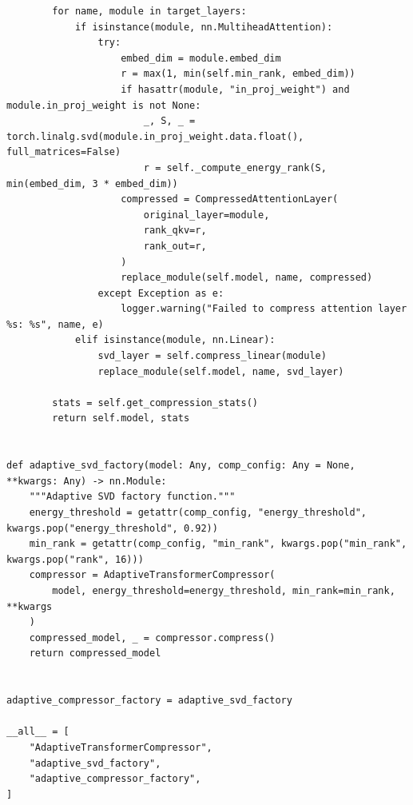 \begin{lstlisting}
        for name, module in target_layers:
            if isinstance(module, nn.MultiheadAttention):
                try:
                    embed_dim = module.embed_dim
                    r = max(1, min(self.min_rank, embed_dim))
                    if hasattr(module, "in_proj_weight") and module.in_proj_weight is not None:
                        _, S, _ = torch.linalg.svd(module.in_proj_weight.data.float(), full_matrices=False)
                        r = self._compute_energy_rank(S, min(embed_dim, 3 * embed_dim))
                    compressed = CompressedAttentionLayer(
                        original_layer=module,
                        rank_qkv=r,
                        rank_out=r,
                    )
                    replace_module(self.model, name, compressed)
                except Exception as e:
                    logger.warning("Failed to compress attention layer %s: %s", name, e)
            elif isinstance(module, nn.Linear):
                svd_layer = self.compress_linear(module)
                replace_module(self.model, name, svd_layer)

        stats = self.get_compression_stats()
        return self.model, stats


def adaptive_svd_factory(model: Any, comp_config: Any = None, **kwargs: Any) -> nn.Module:
    """Adaptive SVD factory function."""
    energy_threshold = getattr(comp_config, "energy_threshold", kwargs.pop("energy_threshold", 0.92))
    min_rank = getattr(comp_config, "min_rank", kwargs.pop("min_rank", kwargs.pop("rank", 16)))
    compressor = AdaptiveTransformerCompressor(
        model, energy_threshold=energy_threshold, min_rank=min_rank, **kwargs
    )
    compressed_model, _ = compressor.compress()
    return compressed_model


adaptive_compressor_factory = adaptive_svd_factory

__all__ = [
    "AdaptiveTransformerCompressor",
    "adaptive_svd_factory",
    "adaptive_compressor_factory",
]
\end{lstlisting}
